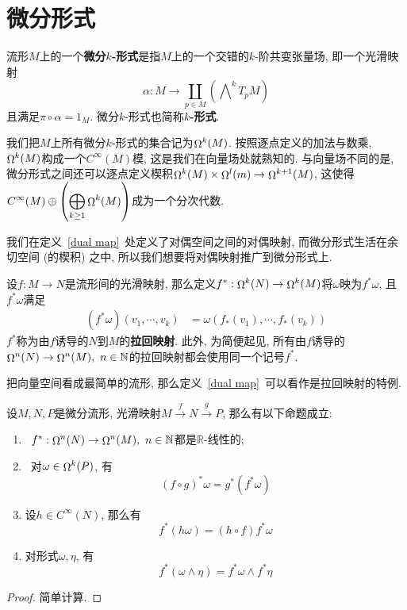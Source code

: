 \section{微分形式}\label{section_forms}
\begin{defn}
    流形$M$上的一个\textbf{微分$k$-形式}是指$M$上的一个交错的$k$-阶共变张量场, 即一个光滑映射
    \[\alpha:M\to\coprod_{p\in M}\left(\bigwedge\nolimits^kT_pM\right)\]
    且满足$\pi\circ\alpha=1_M$.
    微分$k$-形式也简称\textbf{$k$-形式}.
\end{defn}

\begin{sym}
    我们把$M$上所有微分$k$-形式的集合记为$\mathop\Omega\nolimits^k(M)$.
    按照逐点定义的加法与数乘, $\mathop\Omega\nolimits^k(M)$构成一个$C^\infty(M)$模, 这是我们在向量场处就熟知的.
    与向量场不同的是, 微分形式之间还可以逐点定义楔积$\mathop\Omega\nolimits^k(M)\times\mathop\Omega\nolimits^l(m)\to\mathop\Omega\nolimits^{k+1}(M)$, 这使得$\displaystyle C^\infty(M)\oplus\left(\bigoplus_{k\geq 1}\mathop\Omega\nolimits^k(M)\right)$成为一个分次代数.
\end{sym}

我们在定义~\ref{dual map}~处定义了对偶空间之间的对偶映射, 而微分形式生活在余切空间 (的楔积) 之中, 所以我们想要将对偶映射推广到微分形式上.

\begin{defn}\label{pullback_def}
    设$f:M\to N$是流形间的光滑映射, 那么定义$f^*:\mathop\Omega\nolimits^k(N)\to\mathop\Omega\nolimits^k(M)$将$\omega$映为$f^*\omega$, 且$f^*\omega$满足
    \begin{align*}
        (f^*\omega)(v_1,\cdots,v_k)&=\omega(f_*(v_1),\cdots,f_*(v_k))
    \end{align*}
    $f^*$称为由$f$诱导的$N$到$M$的\textbf{拉回映射}.
    此外, 为简便起见, 所有由$f$诱导的$\form^n(N)\to\form^n(M),\ n\in\mathbb{N}$的拉回映射都会使用同一个记号$f^*$.
\end{defn}

把向量空间看成最简单的流形, 那么定义~\ref{dual map}~可以看作是拉回映射的特例.

\begin{prop}[拉回映射的性质]
    设$M,N,P$是微分流形, 光滑映射$M\xrightarrow{f}N\xrightarrow{g}P$, 那么有以下命题成立:
    \begin{enumerate}[{\rm 1.}]
        \item {}\ $f^*:\form^n(N)\to\form^n(M),\ n\in\mathbb{N}$都是$\mathbb{R}$-线性的;
        \item {}\ 对$\omega\in\mathop\Omega\nolimits^k(P)$, 有
        \[(f\circ g)^*\omega=g^*(f^*\omega)\]
        \item 设$h\in C^\infty(N)$, 那么有
        \[f^*(h\omega)=(h\circ f)f^*\omega\]
        \item 对形式$\omega,\eta$, 有
        \[f^*(\omega\wedge\eta)=f^*\omega\wedge f^*\eta\]
    \end{enumerate}
\end{prop}
\begin{proof}
    简单计算.
\end{proof}

